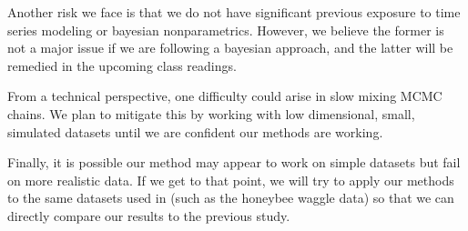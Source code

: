 \documentclass[12pt]{article}
\begin{document}
Another risk we face is that we do not have significant previous exposure to time series modeling or bayesian nonparametrics. However, we believe the former is not a major issue if we are following a bayesian approach, and the latter will be remedied in the upcoming class readings.


From a technical perspective, one difficulty could arise in slow mixing MCMC chains. We plan to mitigate this by working with low dimensional, small, simulated datasets until we are confident our methods are working.

Finally, it is possible our method may appear to work on simple datasets but fail on more realistic data. If we get to that point, we will try to apply our methods to the same datasets used in \cite{fox_nonparametric_2009} (such as the honeybee waggle data) so that we can directly compare our results to the previous study.



\end{document}
